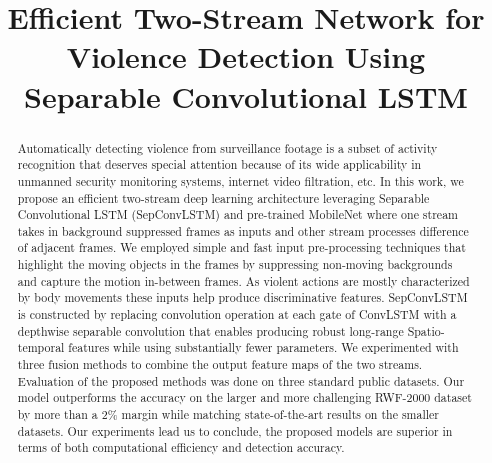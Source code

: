 \documentclass[conference]{IEEEtran}
\begin{document}
\title{Efficient Two-Stream Network for Violence Detection Using Separable Convolutional LSTM}      

\makeatletter







\author{
}





\maketitle

\begin{abstract}
Automatically detecting violence from surveillance footage is a subset of activity recognition that deserves special attention because of its wide applicability in unmanned security monitoring systems, internet video filtration, etc. In this work, we propose an efficient two-stream deep learning architecture leveraging Separable Convolutional LSTM (SepConvLSTM) and pre-trained MobileNet where one stream takes in background suppressed frames as inputs and other stream processes difference of adjacent frames. We employed simple and fast input pre-processing techniques that highlight the moving objects in the frames by suppressing non-moving backgrounds and capture the motion in-between frames. As violent actions are mostly characterized by body movements these inputs help produce discriminative features. SepConvLSTM is constructed by replacing convolution operation at each gate of ConvLSTM with a depthwise separable convolution that enables producing robust long-range Spatio-temporal features while using substantially fewer parameters. We experimented with three fusion methods to combine the output feature maps of the two streams. Evaluation of the proposed methods was done on three standard public datasets. Our model outperforms the accuracy on the larger and more challenging RWF-2000 dataset by more than a 2\% margin while matching state-of-the-art results on the smaller datasets. Our experiments lead us to conclude, the proposed models are superior in terms of both computational efficiency and detection accuracy.
\end{abstract}
\end{document}
